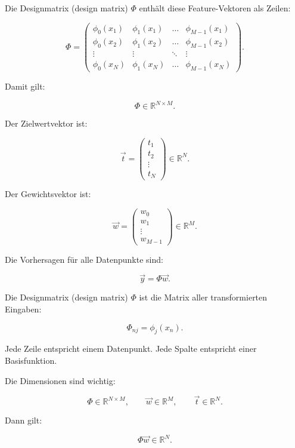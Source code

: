 Die Designmatrix (design matrix) \(\Phi\) enthält diese Feature-Vektoren als Zeilen:

\[
    \Phi
    =
    \begin{pmatrix}
        \phi_0(x_1) & \phi_1(x_1) & \dots & \phi_{M-1}(x_1) \\
        \phi_0(x_2) & \phi_1(x_2) & \dots & \phi_{M-1}(x_2) \\
        \vdots & \vdots & \ddots & \vdots \\
        \phi_0(x_N) & \phi_1(x_N) & \dots & \phi_{M-1}(x_N)
    \end{pmatrix}.
\]

Damit gilt:

\[
    \Phi \in \mathbb{R}^{N \times M}.
\]

Der Zielwertvektor ist:

\[
    \vec{t}
    =
    \begin{pmatrix}
        t_1 \\
        t_2 \\
        \vdots \\
        t_N
    \end{pmatrix}
    \in \mathbb{R}^{N}.
\]

Der Gewichtsvektor ist:

\[
    \vec{w}
    =
    \begin{pmatrix}
        w_0 \\
        w_1 \\
        \vdots \\
        w_{M-1}
    \end{pmatrix}
    \in \mathbb{R}^{M}.
\]

Die Vorhersagen für alle Datenpunkte sind:

\[
    \vec{y}
    =
    \Phi\vec{w}.
\]

\begin{definitionbox}
Die Designmatrix (design matrix) \(\Phi\) ist die Matrix aller transformierten Eingaben:

\[
    \Phi_{nj}
    =
    \phi_j(x_n).
\]

Jede Zeile entspricht einem Datenpunkt.
Jede Spalte entspricht einer Basisfunktion.
\end{definitionbox}

\begin{notebox}
Die Dimensionen sind wichtig:

\[
    \Phi \in \mathbb{R}^{N \times M},
    \qquad
    \vec{w} \in \mathbb{R}^{M},
    \qquad
    \vec{t} \in \mathbb{R}^{N}.
\]

Dann gilt:

\[
    \Phi\vec{w} \in \mathbb{R}^{N}.
\]
\end{notebox}

